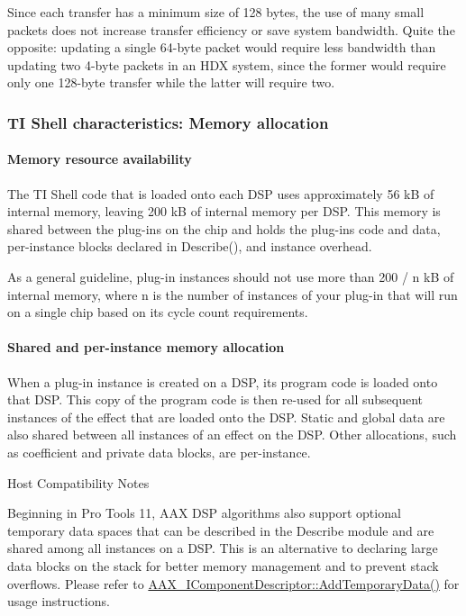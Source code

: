 Since each transfer has a minimum size of 128 bytes, the use of many small packets does not increase transfer efficiency or save system bandwidth. Quite the opposite\+: updating a single 64-\/byte packet would require less bandwidth than updating two 4-\/byte packets in an H\+D\+X system, since the former would require only one 128-\/byte transfer while the latter will require two.

\hypertarget{a00362_subsection__ti_shell_characteristics_memory_allocation}{}\subsubsection{T\+I Shell characteristics\+: Memory allocation}\label{a00362_subsection__ti_shell_characteristics_memory_allocation}
 \hypertarget{a00362_subsubsection__memory_resource_availability_}{}\paragraph{Memory resource availability}\label{a00362_subsubsection__memory_resource_availability_}
 The T\+I Shell code that is loaded onto each D\+S\+P uses approximately 56 k\+B of internal memory, leaving 200 k\+B of internal memory per D\+S\+P. This memory is shared between the plug-\/ins on the chip and holds the plug-\/ins\textquotesingle{} code and data, per-\/instance blocks declared in Describe(), and instance overhead.

As a general guideline, plug-\/in instances should not use more than 200 / n k\+B of internal memory, where n is the number of instances of your plug-\/in that will run on a single chip based on its cycle count requirements.

\hypertarget{a00362_subsubsection__shared_and_perinstance_memory_allocation_}{}\paragraph{Shared and per-\/instance memory allocation}\label{a00362_subsubsection__shared_and_perinstance_memory_allocation_}
 When a plug-\/in instance is created on a D\+S\+P, its program code is loaded onto that D\+S\+P. This copy of the program code is then re-\/used for all subsequent instances of the effect that are loaded onto the D\+S\+P. Static and global data are also shared between all instances of an effect on the D\+S\+P. Other allocations, such as coefficient and private data blocks, are per-\/instance.

\begin{DoxyRefDesc}{Host Compatibility Notes}
\item[\hyperlink{a00380__compatibility_notes000021}{Host Compatibility Notes}]Beginning in Pro Tools 11, A\+A\+X D\+S\+P algorithms also support optional temporary data spaces that can be described in the Describe module and are shared among all instances on a D\+S\+P. This is an alternative to declaring large data blocks on the stack for better memory management and to prevent stack overflows. Please refer to \hyperlink{a00088_ad8daad601b60fdbd6134fe0c8faa2fc4}{A\+A\+X\+\_\+\+I\+Component\+Descriptor\+::\+Add\+Temporary\+Data()} for usage instructions.\end{DoxyRefDesc}


